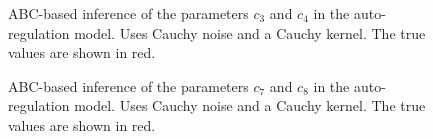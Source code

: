 \begin{figure}[htp]%
    \centering
    \qquad
    \caption{ABC-based inference of the parameters $c_3$ and $c_4$ in the auto-regulation model. Uses Cauchy noise and a Cauchy kernel. The true values are shown in red.}%
    \label{fig:ar-abcmh-cauchy-cauchy-2}%
\end{figure}

\begin{figure}[htp]%
    \centering
    \qquad
    \caption{ABC-based inference of the parameters $c_7$ and $c_8$ in the auto-regulation model. Uses Cauchy noise and a Cauchy kernel. The true values are shown in red.}%
    \label{fig:ar-abcmh-cauchy-cauchy-3}%
\end{figure}
